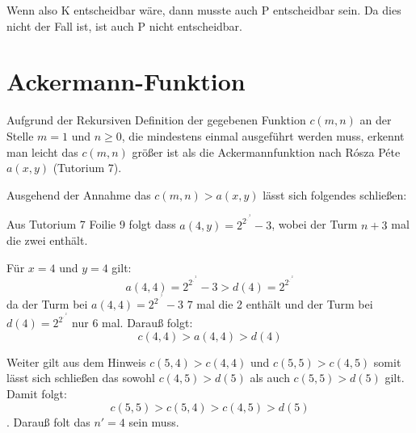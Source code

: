 \documentclass[10pt,leqno ]{article}
\begin{document}
\begin{flushleft}
    Wenn also K entscheidbar wäre, dann musste auch P entscheidbar sein. Da dies nicht der Fall ist, ist auch P nicht entscheidbar. 
\end{flushleft}

\pagebreak

\section{Ackermann-Funktion}

Aufgrund der Rekursiven Definition der gegebenen Funktion $c(m,n)$ an der Stelle $m=1$ und  $n \geq 0$, die mindestens einmal ausgeführt werden muss, erkennt man leicht das  $c(m,n)$ größer ist als die Ackermannfunktion nach Rósza Péte  $a(x,y)$ (Tutorium 7). 
\begin{flushleft}
Ausgehend der Annahme das $c(m,n) > a(x,y)$ lässt sich folgendes schließen: 
\end{flushleft}

\begin{flushleft}
Aus Tutorium 7 Foilie 9 folgt dass $a(4,y)=2^{2^{.^{.^{2}}}}-3$, wobei der Turm $n+3$ mal die zwei enthält.
\end{flushleft}

\begin{flushleft}
    Für $x=4$ und $y=4$ gilt: \[ a(4,4)= 2^{2^{.^{.^{2}}}} - 3 > d(4) =  2^{2^{.^{.^{2}}}} \] da der Turm bei $a(4,4)= 2^{2^{.^{.^{2}}}} - 3$ $7$ mal die 2 enthält und der Turm bei $d(4) =  2^{2^{.^{.^{2}}}}$ nur 6 mal. Darauß folgt: \[ c(4,4) > a(4,4) > d(4)  \]
\end{flushleft}

\begin{flushleft}
    Weiter gilt aus dem Hinweis  $c(5,4) > c(4,4)$ und $c(5,5) > c(4,5)$ somit lässt sich schließen das sowohl $c(4,5) > d(5)$ als auch $c(5,5) > d(5)$ gilt. Damit folgt: \[ c(5,5) > c(5,4) > c(4,5) > d(5) \]. Darauß folt das $n'=4$ sein muss.
\end{flushleft}
\end{document}
